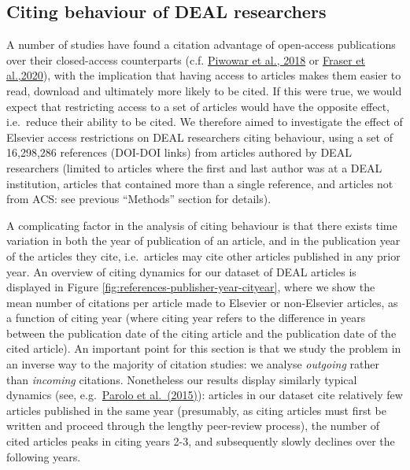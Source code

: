 \documentclass[
]{article}
\begin{document}
\hypertarget{citing-behaviour-of-deal-researchers}{%
\subsection{Citing behaviour of DEAL researchers}\label{citing-behaviour-of-deal-researchers}}

A number of studies have found a citation advantage of open-access publications over their closed-access counterparts (c.f. \href{https://doi.org/10.7717/peerj.4375}{Piwowar et al., 2018} or \href{https://doi.org/10.1162/qss_a_00043}{Fraser et al.,2020}), with the implication that having access to articles makes them easier to read, download and ultimately more likely to be cited. If this were true, we would expect that restricting access to a set of articles would have the opposite effect, i.e.~reduce their ability to be cited. We therefore aimed to investigate the effect of Elsevier access restrictions on DEAL researchers citing behaviour, using a set of 16,298,286 references (DOI-DOI links) from articles authored by DEAL researchers (limited to articles where the first and last author was at a DEAL institution, articles that contained more than a single reference, and articles not from ACS: see previous ``Methods'' section for details).

A complicating factor in the analysis of citing behaviour is that there exists time variation in both the year of publication of an article, and in the publication year of the articles they cite, i.e.~articles may cite other articles published in any prior year. An overview of citing dynamics for our dataset of DEAL articles is displayed in Figure \ref{fig:references-publisher-year-cityear}, where we show the mean number of citations per article made to Elsevier or non-Elsevier articles, as a function of citing year (where citing year refers to the difference in years between the publication date of the citing article and the publication date of the cited article). An important point for this section is that we study the problem in an inverse way to the majority of citation studies: we analyse \emph{outgoing} rather than \emph{incoming} citations. Nonetheless our results display similarly typical dynamics (see, e.g.~\href{https://doi.org/10.1016/j.joi.2015.07.006}{Parolo et al.~(2015)}): articles in our dataset cite relatively few articles published in the same year (presumably, as citing articles must first be written and proceed through the lengthy peer-review process), the number of cited articles peaks in citing years 2-3, and subsequently slowly declines over the following years.
\end{document}
